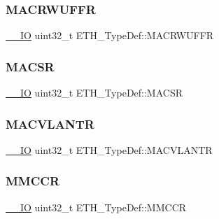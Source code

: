 \mbox{\label{struct_e_t_h___type_def_a8cd8da723ca1469d767de1334e16ec9d}} 
\subsubsection{\texorpdfstring{MACRWUFFR}{MACRWUFFR}}
{\footnotesize\ttfamily \mbox{\hyperlink{group___c_m_s_i_s___c_m3__core__definitions_gaec43007d9998a0a0e01faede4133d6be}{\+\_\+\+\_\+\+IO}} uint32\+\_\+t E\+T\+H\+\_\+\+Type\+Def\+::\+M\+A\+C\+R\+W\+U\+F\+FR}

\mbox{\label{struct_e_t_h___type_def_a9bee2fa58555f6725fc14a8d42484d42}} 
\subsubsection{\texorpdfstring{MACSR}{MACSR}}
{\footnotesize\ttfamily \mbox{\hyperlink{group___c_m_s_i_s___c_m3__core__definitions_gaec43007d9998a0a0e01faede4133d6be}{\+\_\+\+\_\+\+IO}} uint32\+\_\+t E\+T\+H\+\_\+\+Type\+Def\+::\+M\+A\+C\+SR}

\mbox{\label{struct_e_t_h___type_def_a0792c8c170502e3466518d200ca297c3}} 
\subsubsection{\texorpdfstring{MACVLANTR}{MACVLANTR}}
{\footnotesize\ttfamily \mbox{\hyperlink{group___c_m_s_i_s___c_m3__core__definitions_gaec43007d9998a0a0e01faede4133d6be}{\+\_\+\+\_\+\+IO}} uint32\+\_\+t E\+T\+H\+\_\+\+Type\+Def\+::\+M\+A\+C\+V\+L\+A\+N\+TR}

\mbox{\label{struct_e_t_h___type_def_a530d6551e73b9b616d8dc23a53e29708}} 
\subsubsection{\texorpdfstring{MMCCR}{MMCCR}}
{\footnotesize\ttfamily \mbox{\hyperlink{group___c_m_s_i_s___c_m3__core__definitions_gaec43007d9998a0a0e01faede4133d6be}{\+\_\+\+\_\+\+IO}} uint32\+\_\+t E\+T\+H\+\_\+\+Type\+Def\+::\+M\+M\+C\+CR}

